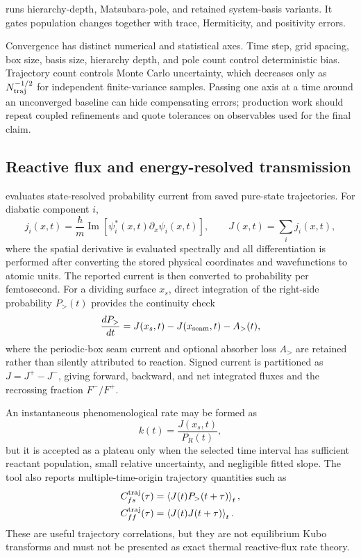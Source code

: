 \documentclass[11pt]{article}
\newcommand{\code}[1]{\texttt{\detokenize{#1}}}
\begin{document}
\code{heom_convergence.py} runs hierarchy-depth, Matsubara-pole, and retained
system-basis variants. It gates population changes together with trace,
Hermiticity, and positivity errors.

Convergence has distinct numerical and statistical axes. Time step, grid spacing,
box size, basis size, hierarchy depth, and pole count control deterministic bias.
Trajectory count controls Monte Carlo uncertainty, which decreases only as
$N_{\rm traj}^{-1/2}$ for independent finite-variance samples. Passing one axis at a
time around an unconverged baseline can hide compensating errors; production work
should repeat coupled refinements and quote tolerances on observables used for the
final claim.

\subsection{Reactive flux and energy-resolved transmission}

\code{reactive_flux.py} evaluates state-resolved probability current from saved
pure-state trajectories. For diabatic component $i$,
\begin{equation}
 j_i(x,t)=\frac{\hbar}{m}\operatorname{Im}
 \left[\psi_i^*(x,t)\partial_x\psi_i(x,t)\right],\qquad
 J(x,t)=\sum_i j_i(x,t),
\end{equation}
where the spatial derivative is evaluated spectrally and all differentiation is
performed after converting the stored physical coordinates and wavefunctions to
atomic units. The reported current is then converted to probability per femtosecond.
For a dividing surface $x_s$, direct integration of the right-side probability
$P_>(t)$ provides the continuity check
\begin{equation}
 \frac{dP_>}{dt}=J(x_s,t)-J(x_{\rm seam},t)-A_>(t),
\end{equation}
where the periodic-box seam current and optional absorber loss $A_>$ are retained
rather than silently attributed to reaction. Signed current is partitioned as
$J=J^+-J^-$, giving forward, backward, and net integrated fluxes and the recrossing
fraction $F^-/F^+$.

An instantaneous phenomenological rate may be formed as
\begin{equation}
 k(t)=\frac{J(x_s,t)}{P_R(t)},
\end{equation}
but it is accepted as a plateau only when the selected time interval has sufficient
reactant population, small relative uncertainty, and negligible fitted slope. The
tool also reports multiple-time-origin trajectory quantities such as
\begin{align}
 C_{fs}^{\rm traj}(\tau)&=\left\langle J(t)P_>(t+\tau)\right\rangle_t,\\
 C_{ff}^{\rm traj}(\tau)&=\left\langle J(t)J(t+\tau)\right\rangle_t.
\end{align}
These are useful trajectory correlations, but they are not equilibrium Kubo
transforms and must not be presented as exact thermal reactive-flux rate theory.
\end{document}
